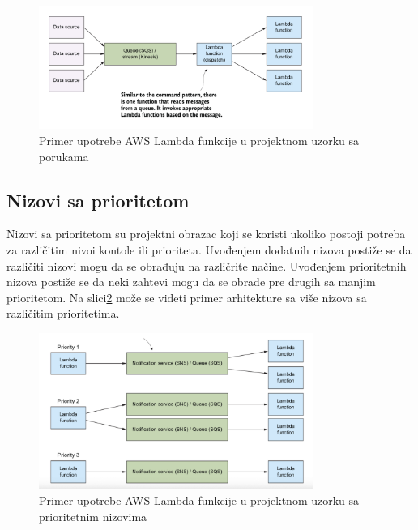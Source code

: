 \documentclass[12pt,oneside]{memoir}
\begin{document}
\begin{figure}[!ht]
  \centering
  \includegraphics[width=0.8\textwidth]{Slika 13.png}
  \caption{Primer upotrebe AWS Lambda funkcije u projektnom uzorku sa porukama}
  \label{fig:poruke}
\end{figure}
 
\subsection{Nizovi sa prioritetom}
Nizovi sa prioritetom su projektni obrazac koji se koristi ukoliko postoji potreba za različitim nivoi kontole ili prioriteta. Uvođenjem dodatnih nizova postiže se da različiti nizovi mogu da se obrađuju na različrite načine. Uvođenjem prioritetnih nizova postiže se da neki zahtevi mogu da se obrade pre drugih sa manjim prioritetom. Na slici\ref{fig:nizovi} može se videti primer arhitekture sa više nizova sa različitim prioritetima.

\begin{figure}[!ht]
  \centering
  \includegraphics[width=0.8\textwidth]{Slika 14.png}
  \caption{Primer upotrebe AWS Lambda funkcije u projektnom uzorku sa prioritetnim nizovima}
  \label{fig:nizovi}
\end{figure}
 
\end{document}
